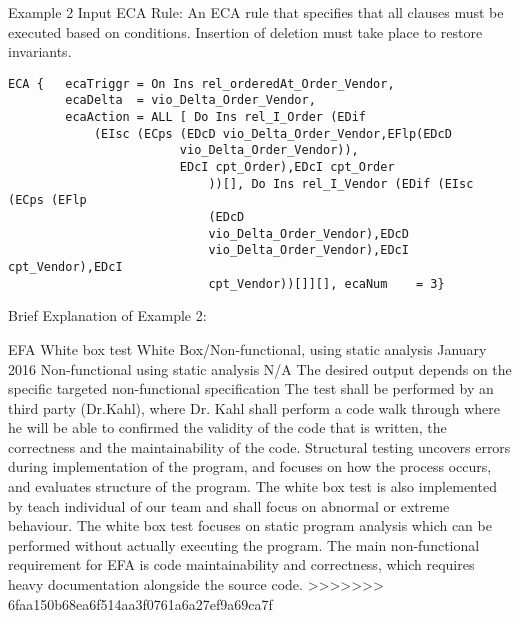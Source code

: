 \documentclass[12pt]{report}
\begin{document}
Example 2 Input ECA Rule: An ECA rule that specifies that all clauses must be 
executed based on conditions. Insertion of deletion must take place to restore 
invariants. 
\begin{verbatim}
ECA {	ecaTriggr = On Ins rel_orderedAt_Order_Vendor, 
		ecaDelta  = vio_Delta_Order_Vendor, 
		ecaAction = ALL [ Do Ins rel_I_Order (EDif 
			(EIsc (ECps	(EDcD vio_Delta_Order_Vendor,EFlp(EDcD 
						vio_Delta_Order_Vendor)),
						EDcI cpt_Order),EDcI cpt_Order
							))[], Do Ins rel_I_Vendor (EDif (EIsc (ECps (EFlp 
							(EDcD 
							vio_Delta_Order_Vendor),EDcD 
							vio_Delta_Order_Vendor),EDcI cpt_Vendor),EDcI 
							cpt_Vendor))[]][], ecaNum    = 3}
\end{verbatim}

Brief Explanation of Example 2: 

{EFA White box test} 
{White Box/Non-functional, using static analysis}  
{January 2016}
{Non-functional using static analysis}
{N/A}
{The desired output depends on the specific targeted non-functional specification}
{The test shall be performed by an third party (Dr.Kahl), where Dr. Kahl shall perform a code walk through where he will be able to confirmed the validity of the code that is written, the correctness and the maintainability of the code. Structural testing uncovers errors during implementation of the program, and focuses on how the process occurs, and evaluates structure of the program. The white box test is also implemented by teach individual of our team and shall focus on abnormal or extreme behaviour. The white box test focuses on static program analysis which can be performed without actually executing the program. The main non-functional requirement for EFA is code maintainability and correctness, which requires heavy documentation alongside the source code. }
>>>>>>> 6faa150b68ea6f514aa3f0761a6a27ef9a69ca7f
\end{document}
